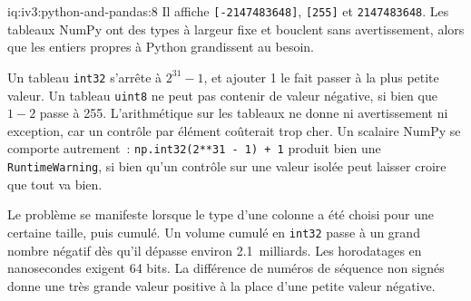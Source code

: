 \begin{solution}{iq:iv3:python-and-pandas:8}
Il affiche \texttt{[-2147483648]}, \texttt{[255]} et \texttt{2147483648}. Les tableaux NumPy ont des types à largeur fixe et bouclent sans avertissement, alors que les entiers propres à Python grandissent au besoin.

Un tableau \texttt{int32} s'arrête à $2^{31} - 1$, et ajouter 1 le fait passer à la plus petite valeur. Un tableau \texttt{uint8} ne peut pas contenir de valeur négative, si bien que $1 - 2$ passe à 255. L'arithmétique sur les tableaux ne donne ni avertissement ni exception, car un contrôle par élément coûterait trop cher. Un scalaire NumPy se comporte autrement~: \texttt{np.int32(2**31 - 1) + 1} produit bien une \texttt{RuntimeWarning}, si bien qu'un contrôle sur une valeur isolée peut laisser croire que tout va bien.

Le problème se manifeste lorsque le type d'une colonne a été choisi pour une certaine taille, puis cumulé. Un volume cumulé en \texttt{int32} passe à un grand nombre négatif dès qu'il dépasse environ 2.1~milliards. Les horodatages en nanosecondes exigent 64 bits. La différence de numéros de séquence non signés donne une très grande valeur positive à la place d'une petite valeur négative.

\end{solution}

